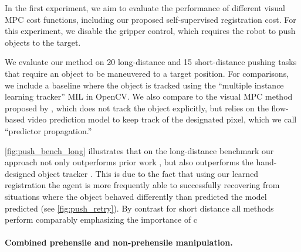 In the first experiment, we aim to evaluate the performance of different visual MPC cost functions, including our proposed self-supervised registration cost. For this experiment, we disable the gripper control, which requires the robot to push objects to the target. 

We evaluate our method on 20 long-distance and 15 short-distance pushing tasks that require an object to be maneuvered to a target position. For comparisons, we include a baseline where the object is tracked using the ``multiple instance learning tracker'' MIL \cite{babenko2009visual} in OpenCV. 
We also compare to the visual MPC method proposed by \citet{sna},
which does not track the object explicitly, but relies on the flow-based video prediction model to keep track of the designated pixel, which we call ``predictor propagation.'' 

\autoref{fig:push_bench_long} illustrates that on the long-distance benchmark our approach not only outperforms prior work \cite{sna}, but also outperforms the hand-designed object tracker \cite{babenko2009visual}. This is due to the fact that using our learned registration the agent is more frequently able to successfully recovering from situations where the object behaved differently than predicted the model predicted (see \autoref{fig:push_retry}). By contrast for short distance all methods perform comparably emphasizing the importance of c

\vspace{-0.1in}
\paragraph{Combined prehensile and non-prehensile manipulation.}

